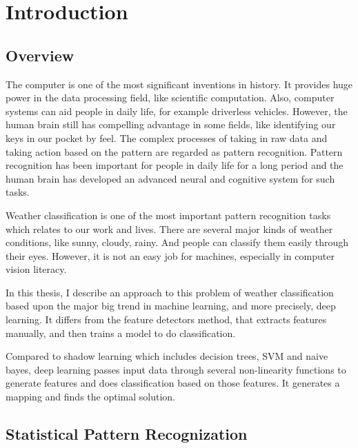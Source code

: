 \chapter{Introduction} %
\label{Chapter1}


\section{Overview}

The computer is one of the most significant inventions in history. It provides huge power in the data processing field, like scientific computation. Also, computer systems can aid people in daily life, for example driverless vehicles. However, the human brain still has compelling advantage in some fields, like identifying our keys in our pocket by feel. The complex processes of taking in raw data and taking action based on the pattern are regarded as pattern recognition. Pattern recognition has been important for people in daily life for a long period and the human brain has developed an advanced neural and cognitive system for such tasks.

Weather classification is one of the most important pattern recognition tasks which relates to our work and lives. There are several major kinds of weather conditions, like sunny, cloudy, rainy. And people can classify them easily through their eyes. However, it is not an easy job for machines, especially in computer vision literacy. 

In this thesis, I describe an approach to this problem of weather classification based upon the major big trend in machine learning, and more precisely, deep learning. It differs from the feature detectors method, that extracts features manually, and then trains a model to do classification.  

Compared to shadow learning which includes decision trees, SVM and naive bayes, deep learning passes input data through several non-linearity functions to generate features and does classification based on those features. It generates a mapping and finds the optimal solution.

\section{Statistical Pattern Recognization}

